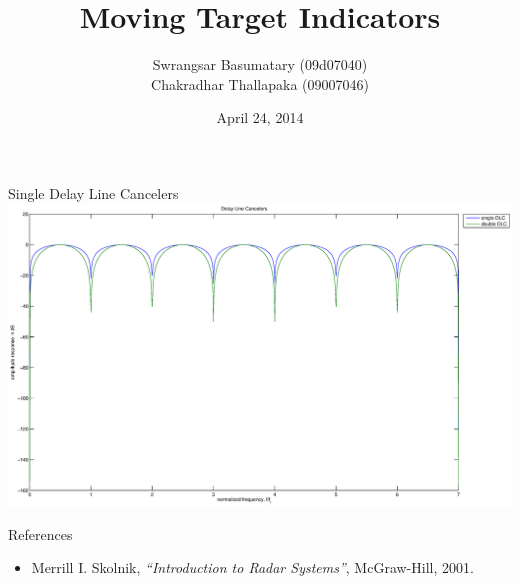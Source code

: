 \documentclass[mathserif]{beamer}
\title{Moving Target Indicators}
\author{Swrangsar Basumatary (09d07040) \\ Chakradhar Thallapaka (09007046)}
\institute{Department of Electrical Engineering \\ IIT Bombay, Powai}
\date{April 24, 2014}
\begin{document}
    \frame{\titlepage}
    
    
    \begin{frame}{Single Delay Line Cancelers}
    	\includegraphics[width=\linewidth]{delayLineCancelers}
    \end{frame}
    
    
    
 
    
    \begin{frame}{References}
        
        \begin{itemize}
                 \item Merrill I. Skolnik, \emph{``Introduction to Radar Systems''}, McGraw-Hill, 2001.
        \end{itemize}
    \end{frame}
    
    
\end{document}
